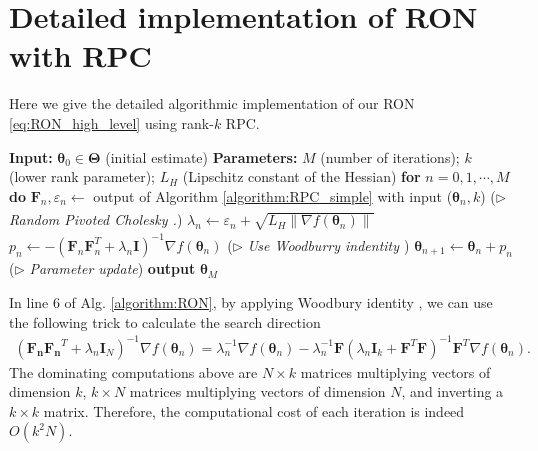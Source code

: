 \documentclass[11pt]{amsart}
\theoremstyle{plain}
\theoremstyle{definition}
\theoremstyle{remark}
\def\I{\mathbf{I}}
\def\eps{\varepsilon}
\def\param{\boldsymbol{\theta}}
\def\Param{\boldsymbol{\Theta}}
\def\I{\mathbf{I}}
\newcommand{\commHL}[1]{{\textcolor{blue}{#1}}}
\begin{document}
\section{Detailed implementation of RON with RPC}
\label{sec:alg_detail}
Here we give the detailed algorithmic implementation of our RON \eqref{eq:RON_high_level} using rank-$k$ RPC.
\begin{algorithm}[H]
	\small
	\caption{Regularized Overestimated Newton with RPCholesky}
	\label{algorithm:RON}
	\begin{algorithmic}[1]
		 \State \textbf{Input:} $\param_{0}\in\Param$ (initial estimate)
        \State \textbf{Parameters:}  $M$ (number of iterations); $k$ (lower rank parameter); $L_H$ (Lipschitz constant of the Hessian)
		\State \quad \textbf{for} $n=0,1,\cdots,M$ \textbf{do} 
		\State \quad\quad $\mathbf{F}_n,\eps_n\xleftarrow[]{}$ output of Algorithm \ref{algorithm:RPC_simple} with input ($\param_{n},k$) \hspace{1cm} ($\triangleright$ \textit{Random Pivoted Cholesky \cite{chen2022randomly}.})
        \State \quad\quad $\lambda_n\xleftarrow[]{}\eps_n+\sqrt{L_H\|\nabla f(\param_n)\|}$
        \State \quad\quad $p_{n} \leftarrow - \left(\mathbf{F}_n\mathbf{F}_n^T+\lambda_n\mathbf{I}\right)^{-1}  \nabla f(\param_{n})$ \hspace{3cm} ($\triangleright$ \textit{Use Woodburry indentity \cite{woodbury1950inverting}})
        \State \quad\quad $\param_{n+1}\xleftarrow[]{}\param_{n} + p_n$ \hspace{5cm} ($\triangleright$ \textit{Parameter update})
		\State \textbf{output} $\param_{M}$ 
	\end{algorithmic}
\end{algorithm}

In line 6 of Alg. \ref{algorithm:RON}, by applying Woodbury identity \cite{woodbury1950inverting}, we can use the following trick to calculate the search direction
	\begin{align*}
		(\mathbf{F_n}\mathbf{F_n}^T+\lambda_n \I_{N})^{-1}\nabla f(\param_n) =\lambda_n^{-1}\nabla f(\param_n)-\lambda_n^{-1}\mathbf{F}(\lambda_n\I_k+\mathbf{F}^T\mathbf{F})^{-1}\mathbf{F}^T\nabla f(\param_n).
	\end{align*}
	The dominating computations above are $N\times k$ matrices multiplying vectors of dimension $k$, $k\times N$ matrices multiplying vectors of dimension $N$, and inverting a $k\times k$ matrix. Therefore, the computational cost of each iteration is indeed $O(k^2N)$.
\end{document}
